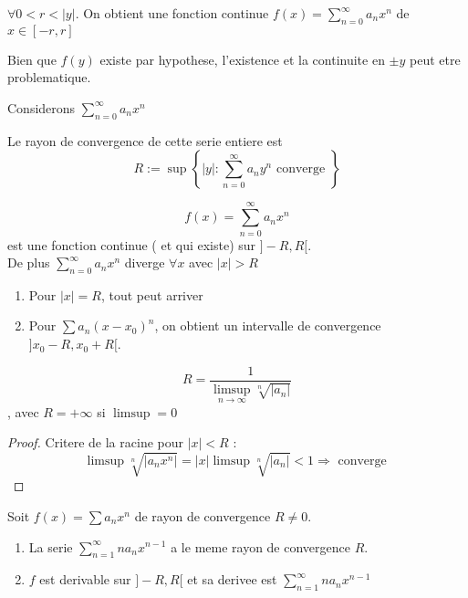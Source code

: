 \documentclass[../main.tex]{subfiles}
\begin{document}
\begin{crly}
	$\forall 0< r < |y|$. On obtient une fonction continue $f( x) = \sum_{n=0}^{ \infty }a_n x^{n}$ de $x \in [ -r,r] $\\
\end{crly}
\begin{rmq}
	Bien que $f( y) $ existe par hypothese, l'existence et la continuite en $\pm y$ peut etre problematique.
\end{rmq}
Considerons $ \sum_{n=0}^{ \infty }a_n x^{n}$ 
\begin{defn}
Le rayon de convergence de cette serie entiere est 
\[ 
R := \sup \left\{ |y|: \sum_{n=0}^{ \infty }a_n y^{n} \text{ converge }  \right\} 
\]

\end{defn}
\begin{crly}
\[ 
	f( x)  = \sum_{n=0}^{ \infty }a_n x^{n}
\]
est une fonction continue ( et qui existe) sur $]-R,R[$.\\
De plus $ \sum_{n=0}^{ \infty }a_n x^{n}$ diverge $\forall x$ avec $|x|> R$
\end{crly}
\begin{rmq}
\begin{enumerate}
\item Pour $|x| = R$, tout peut arriver
\item Pour $ \sum a_n ( x-x_0) ^{n}$, on obtient un intervalle de convergence $]x_0-R, x_0+R[$.
\end{enumerate}
\end{rmq}
\begin{crly}
	 \[ 
		 R = \frac{1}{ \limsup_{n\to \infty } \sqrt[n]{|a_n|}}
	\]
, avec $R= + \infty $ si $\limsup =0$
\end{crly}
\begin{proof}
Critere de la racine pour $|x| < R$ :
\[ 
	\limsup \sqrt[n]{|a_n x^{n}|} = |x| \limsup \sqrt[n]{|a_n|}<1 \Rightarrow \text{ converge } 
\]
\end{proof}
\begin{thm}
	Soit $f( x) = \sum a_n x^{n}$ de rayon de convergence $R\neq 0$.\\
	\begin{enumerate}
	\item La serie $ \sum_{n=1}^{ \infty } n a_n x^{n-1}$ a le meme rayon de convergence $R$.
	\item $f$ est derivable sur $]-R,R[$ et sa derivee est $ \sum_{n=1}^{ \infty } n a_n x^{n-1}$
	\end{enumerate}
	
\end{thm}
\end{document}
